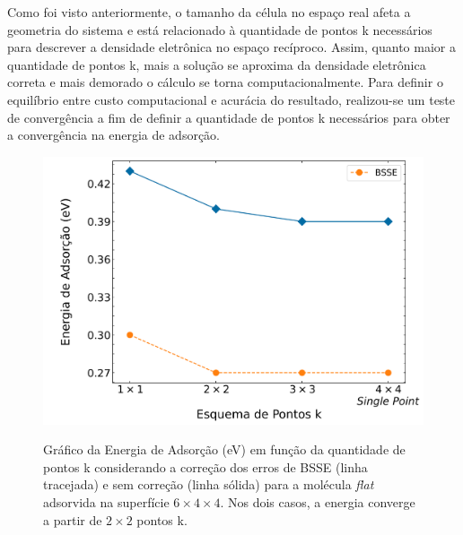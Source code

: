 Como foi visto anteriormente, o tamanho da célula no espaço real afeta a geometria do sistema e está relacionado à quantidade de pontos k necessários para descrever a densidade eletrônica no espaço recíproco. Assim, quanto maior a quantidade de pontos k, mais a solução se aproxima da densidade eletrônica correta e mais demorado o cálculo se torna computacionalmente. Para definir o equilíbrio entre custo computacional e acurácia do resultado, realizou-se um teste de convergência a fim de definir a quantidade de pontos k necessários para obter a convergência na energia de adsorção.  
 \begin{figure}[b!]
	\centering
	\caption{Gráfico da Energia de Adsorção (eV) em função da quantidade de pontos k considerando a correção dos erros de BSSE (linha tracejada) e sem correção (linha sólida) para a molécula \textit{flat} adsorvida na superfície $ 6\times4\times4 $. Nos dois casos, a energia converge a partir de $ 2\times2 $ pontos k.}
	\includegraphics[scale=0.5]{figs/converg.png}
	\label{fig:pontosk}
\end{figure}
 
